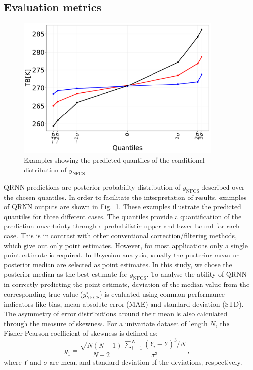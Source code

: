 \documentclass[amt, manuscript]{copernicus}
\newcommand{\ynfcs}{y_\text{NFCS}}
\newcommand{\yonfcs}{y^{\circ}_\text{NFCS}}
\begin{document}
\subsection{Evaluation metrics}
\label{sec:validation}
\begin{figure}[t]
	\centering
	\includegraphics[height=70mm]{Figures/fig01.pdf} 
	\caption{Examples showing the predicted quantiles of the conditional distribution of $\ynfcs$ }
	\label{fig:posterior_distribution_I1V}	
\end{figure}
QRNN predictions are posterior probability distribution of $\ynfcs$ described over the chosen quantiles. In order to facilitate the interpretation of results, examples of QRNN outputs are shown in Fig.~\ref{fig:posterior_distribution_I1V}. These examples illustrate the predicted quantiles for three different cases. The quantiles provide a quantification of the prediction uncertainty through a probabilistic upper and lower bound for each case. This is in contrast with other conventional correction/filtering methods, which give out only point estimates. However, for most applications only a single point estimate is required. In Bayesian analysis, usually the posterior mean or posterior median are selected as point estimates. In this study, we chose the posterior median as the best estimate for $\ynfcs$. To analyse the ability of QRNN in correctly predicting the point estimate, deviation of the median value from the corresponding true value ($\yonfcs$) is evaluated using common performance indicators like bias, mean absolute error (MAE) and standard deviation (STD). The asymmetry of error distributions around their mean is also calculated through the measure of skewness. For a univariate dataset of length $N$, the Fisher-Pearson coefficient of skewness is defined as: 
\begin{equation}
g_1 = 	\frac{\sqrt{N(N-1)}}{N-2} \frac{\sum_{i = 1}^{N}(Y_i - \bar{Y})^3/N}{\sigma^3} \,,
\end{equation}
where $\bar{Y}$ and $\sigma$ are mean and standard deviation of the deviations, respectively.
\end{document}
